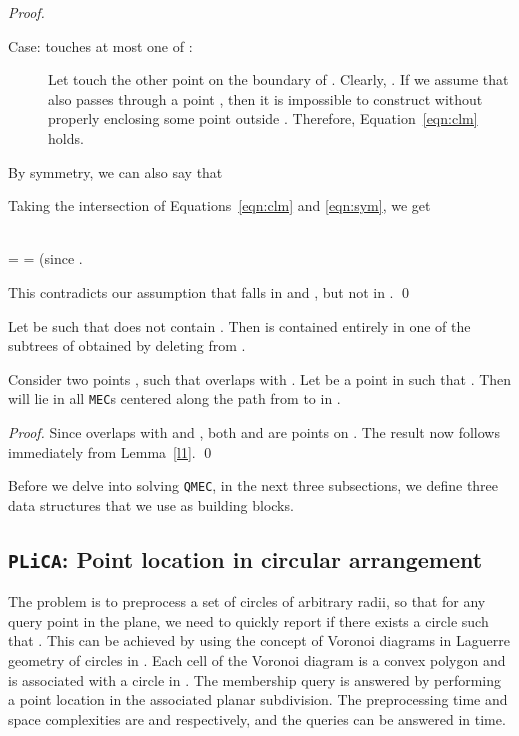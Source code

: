 \documentclass[12pt]{llncs}
\begin{document}
\begin{proof}
\begin{description}
\item[Case:  touches at most one of :]
Let  touch the other point  on the boundary of . 
Clearly, . If we assume that  
 also passes through a point , 
then 
it is  
impossible to construct  without properly enclosing 
some point outside . Therefore, Equation~\ref{eqn:clm} holds.
\end{description}
By symmetry, we can also say that 


Taking the intersection  of Equations~\ref{eqn:clm} and \ref{eqn:sym}, we get

 \\
=  
=  (since  .

This contradicts our assumption that  falls in  and , 
but not in .
\qed 
\end{proof}



\begin{corollary}\label{l2}
Let  be such that  does not contain . Then  is 
contained 
entirely in one 
of the subtrees of  obtained by deleting  from .
\end{corollary}
\begin{corollary}\label{cor:intermediate}
Consider two points , such that  overlaps with  .
Let  be a point in  such that .
Then  will lie in all {\tt MEC}s centered  along 
the path from  to  in . 
\end{corollary}
\begin{proof}
Since  overlaps with   and , both  and  are points on . The result  now follows 
immediately  from Lemma\ \ref{l1}. 
\qed
\end{proof}

Before we delve into solving {\tt QMEC}, in the next three subsections, we define 
three data structures that we use as building blocks.


\vspace{-0.15in}
\subsection{{\tt PLiCA}: Point location in circular arrangement} \label{sec:plica}
The problem is to preprocess a set 
 of circles 
of arbitrary radii, so that for any query point  in the plane, we need to 
quickly report if there exists a circle  such that . 
This can be achieved by using the concept of Voronoi diagrams in Laguerre geometry 
of circles in  \cite{IIM}. Each cell of the Voronoi 
diagram is a convex polygon and is associated with a circle in 
. The membership query is answered by performing a 
point location in the associated planar subdivision. 
The preprocessing time and space complexities are  and 
 respectively, and the queries can be answered in  time.
\end{document}
